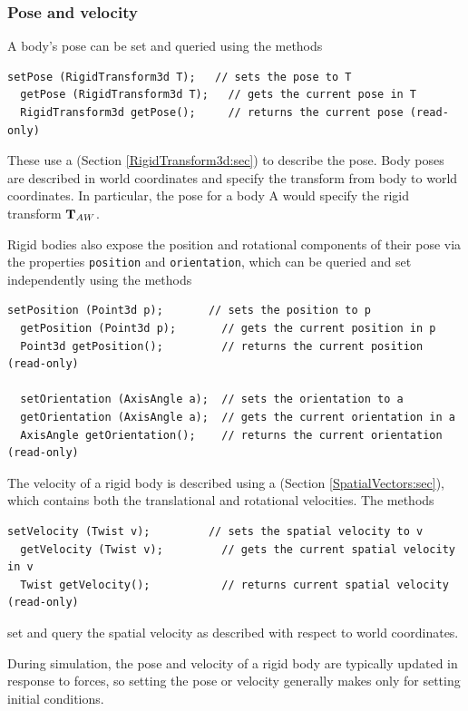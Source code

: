 \subsubsection{Pose and velocity}

A body's pose can be set and
queried using the methods
%
\begin{lstlisting}[]
  setPose (RigidTransform3d T);   // sets the pose to T
  getPose (RigidTransform3d T);   // gets the current pose in T
  RigidTransform3d getPose();     // returns the current pose (read-only)
\end{lstlisting}
%
These use a  (Section
\ref{RigidTransform3d:sec}) to describe the pose. Body poses are
described in world coordinates and specify the transform from body to
world coordinates. In particular, the pose for a body A would specify
the rigid transform ${\bf T}_{AW}$.

Rigid bodies also expose the position and rotational components of
their pose via the properties {\tt position} and {\tt orientation},
which can be queried and set independently using the methods
%
\begin{lstlisting}[]
  setPosition (Point3d p);       // sets the position to p
  getPosition (Point3d p);       // gets the current position in p
  Point3d getPosition();         // returns the current position (read-only)

  setOrientation (AxisAngle a);  // sets the orientation to a
  getOrientation (AxisAngle a);  // gets the current orientation in a
  AxisAngle getOrientation();    // returns the current orientation (read-only)
\end{lstlisting}
%

The velocity of a rigid body is described using a
 (Section
\ref{SpatialVectors:sec}), which contains both the translational and
rotational velocities. The methods
%
\begin{lstlisting}[]
  setVelocity (Twist v);         // sets the spatial velocity to v
  getVelocity (Twist v);         // gets the current spatial velocity in v
  Twist getVelocity();           // returns current spatial velocity (read-only)
\end{lstlisting}
%
set and query the spatial velocity as described with respect to world
coordinates.

During simulation, the pose and velocity of a rigid body are typically
updated in response to forces, so setting the pose or velocity
generally makes only for setting initial conditions.

